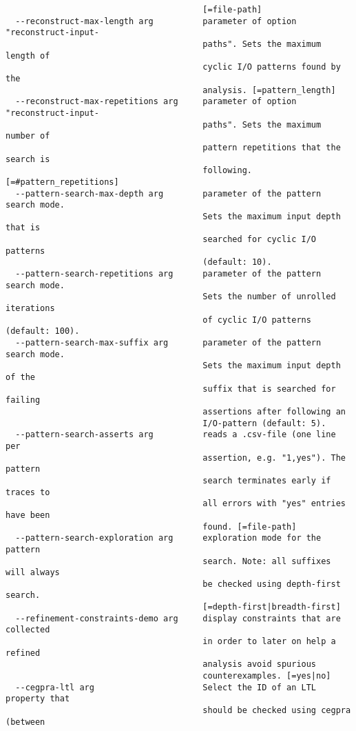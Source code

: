 \documentclass[natbib]{article}
\begin{document}
\begin{verbatim}
                                        [=file-path]
  --reconstruct-max-length arg          parameter of option "reconstruct-input-
                                        paths". Sets the maximum length of 
                                        cyclic I/O patterns found by the 
                                        analysis. [=pattern_length]
  --reconstruct-max-repetitions arg     parameter of option "reconstruct-input-
                                        paths". Sets the maximum number of 
                                        pattern repetitions that the search is 
                                        following. [=#pattern_repetitions]
  --pattern-search-max-depth arg        parameter of the pattern search mode. 
                                        Sets the maximum input depth that is 
                                        searched for cyclic I/O patterns 
                                        (default: 10).
  --pattern-search-repetitions arg      parameter of the pattern search mode. 
                                        Sets the number of unrolled iterations 
                                        of cyclic I/O patterns (default: 100).
  --pattern-search-max-suffix arg       parameter of the pattern search mode. 
                                        Sets the maximum input depth of the 
                                        suffix that is searched for failing 
                                        assertions after following an 
                                        I/O-pattern (default: 5).
  --pattern-search-asserts arg          reads a .csv-file (one line per 
                                        assertion, e.g. "1,yes"). The pattern 
                                        search terminates early if traces to 
                                        all errors with "yes" entries have been
                                        found. [=file-path]
  --pattern-search-exploration arg      exploration mode for the pattern 
                                        search. Note: all suffixes will always 
                                        be checked using depth-first search. 
                                        [=depth-first|breadth-first]
  --refinement-constraints-demo arg     display constraints that are collected 
                                        in order to later on help a refined 
                                        analysis avoid spurious 
                                        counterexamples. [=yes|no]
  --cegpra-ltl arg                      Select the ID of an LTL property that 
                                        should be checked using cegpra (between

\end{verbatim}
\end{document}
